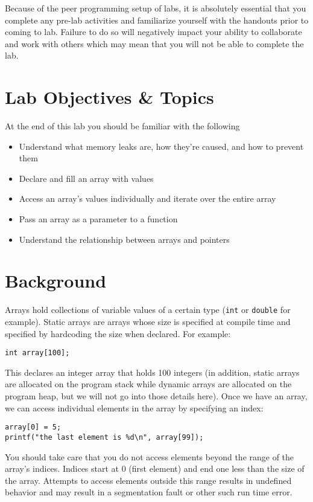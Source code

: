 \documentclass[12pt]{scrartcl}
\begin{document}
Because of the peer programming setup of labs, it is absolutely
essential that you complete any pre-lab activities and familiarize
yourself with the handouts prior to coming to lab.  Failure to do
so will negatively impact your ability to collaborate and work with
others which may mean that you will not be able to complete the
lab.

\section{Lab Objectives \& Topics}
At the end of this lab you should be familiar with the following
\begin{itemize}
  \item Understand what memory leaks are, how they're caused,
  	and how to prevent them
  \item Declare and fill an array with values
  \item Access an array's values individually and iterate over the entire array
  \item Pass an array as a parameter to a function
  \item Understand the relationship between arrays and pointers
\end{itemize}

\section{Background}

Arrays hold collections of variable values of a certain type
(\texttt{int} or \texttt{double} for example).
Static arrays are arrays whose size is specified at compile
time and specified by hardcoding the size when declared.
For example:

\texttt{int array[100];}

This declares an integer array that holds 100 integers (in
addition, static arrays are allocated on the program stack
while dynamic arrays are allocated on the program heap,
but we will not go into those details here).  Once we have
an array, we can access individual elements in the array by
specifying an index:

\begin{verbatim}
array[0] = 5;
printf("the last element is %d\n", array[99]);
\end{verbatim}

You should take care that you do not access elements beyond
the range of the array's indices.  Indices start at 0 (first element)
and end one less than the size of the array.  Attempts to access
elements outside this range results in undefined behavior and
may result in a segmentation fault or other such run time error.
\end{document}
